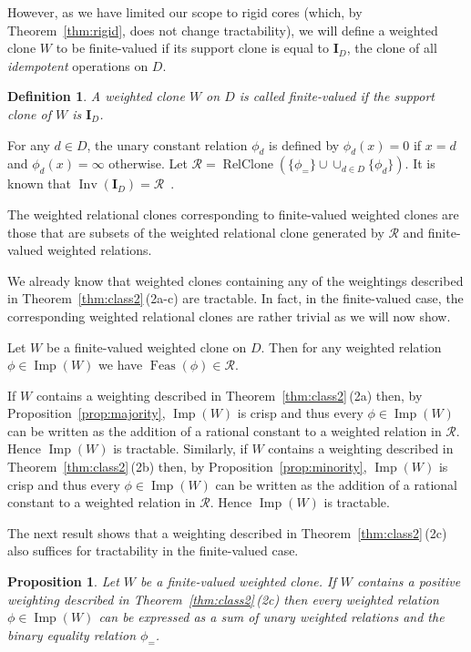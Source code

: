 \documentclass[11pt, reqno]{article}
\DeclareMathOperator{\feas}{Feas}
\DeclareMathOperator{\imp}{Imp}
\DeclareMathOperator{\inv}{Inv}
\DeclareMathOperator{\relclone}{RelClone}
\newtheorem{proposition}[theorem]{Proposition}
\newtheorem{definition}{Definition}
\theoremstyle{remark}
\begin{document}
However, as we have limited our scope to rigid cores (which, by
Theorem~\ref{thm:rigid}, does not change tractability), we will define a
weighted clone $W$ to be finite-valued if its support clone is equal to
$\mathbf{I}_D$, the clone of all \emph{idempotent} operations on $D$. 

\begin{definition} 
A weighted clone $W$ on $D$  is called \emph{finite-valued} if the support clone of $W$ is $\mathbf{I}_D$. 
\end{definition}

For any $d\in D$, the unary constant relation $\phi_d$ is defined by
$\phi_d(x)=0$ if $x=d$ and $\phi_d(x)=\infty$ otherwise. Let
$\mathcal{R}=\relclone(\{\phi_=\}\cup\cup_{d\in D}\{\phi_d\})$. It is known that
$\inv(\mathbf{I}_D)=\mathcal{R}$~\cite{Bulatov05:classifying}.

The weighted relational clones corresponding to finite-valued weighted clones
are those that are subsets of the weighted relational clone generated by
$\mathcal{R}$ and finite-valued weighted relations.

We already know that weighted clones containing any of the weightings described
in Theorem~\ref{thm:class2}\,(2a-c) are tractable. In fact, in the finite-valued
case, the corresponding weighted relational clones are rather trivial as we will
now show.

Let $W$ be a finite-valued weighted clone on $D$. Then for any weighted
relation $\phi\in\imp(W)$ we have $\feas(\phi)\in\mathcal{R}$.

If $W$ contains a weighting described in Theorem~\ref{thm:class2}\,(2a) then, by
Proposition~\ref{prop:majority}, $\imp(W)$ is crisp and thus every
$\phi\in\imp(W)$ can be written as the addition of a rational constant to a
weighted relation in $\mathcal{R}$.
Hence $\imp(W)$ is tractable. Similarly, if $W$ contains a weighting
described in Theorem~\ref{thm:class2}\,(2b) then, by
Proposition~\ref{prop:minority}, $\imp(W)$ is crisp and thus every
$\phi\in\imp(W)$ can be written as the addition of a rational constant to a
weighted relation in $\mathcal{R}$.
Hence $\imp(W)$ is tractable.

The next result shows that a weighting described in
Theorem~\ref{thm:class2}\,(2c) also suffices for tractability in the
finite-valued case.


\begin{proposition}
Let $W$ be a finite-valued weighted clone. If $W$ contains a positive weighting
described in Theorem~\ref{thm:class2}\,(2c) then every weighted relation 
$\phi\in\imp(W)$ can be expressed as a sum of unary weighted relations and the
binary equality relation $\phi_=$.
\end{proposition}
\end{document}
